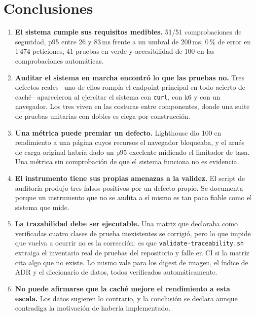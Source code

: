 \documentclass[11pt,a4paper]{article}
\begin{document}
\section{Conclusiones}\label{sec:conclusiones}

\begin{enumerate}[label=\textbf{C\arabic*.},leftmargin=*]
  \item \textbf{El sistema cumple sus requisitos medibles.} 51/51 comprobaciones
        de seguridad, p95 entre 26 y 83\,ms frente a un umbral de 200\,ms, 0\,\% de
        error en 1\,474 peticiones, 41 pruebas en verde y accesibilidad de 100 en
        las comprobaciones automáticas.

  \item \textbf{Auditar el sistema en marcha encontró lo que las pruebas no.} Tres
        defectos reales --uno de ellos rompía el endpoint principal en todo
        acierto de caché-- aparecieron al ejercitar el sistema con \texttt{curl},
        con k6 y con un navegador. Los tres viven en las costuras entre
        componentes, donde una suite de pruebas unitarias con dobles es ciega por
        construcción.

  \item \textbf{Una métrica puede premiar un defecto.} Lighthouse dio 100 en
        rendimiento a una página cuyos recursos el navegador bloqueaba, y el arnés
        de carga original habría dado un p95 excelente midiendo el limitador de
        tasa. Una métrica sin comprobación de que el sistema funciona no es
        evidencia.

  \item \textbf{El instrumento tiene sus propias amenazas a la validez.} El script
        de auditoría produjo tres falsos positivos por un defecto propio. Se
        documenta porque un instrumento que no se audita a sí mismo es tan poco
        fiable como el sistema que mide.

  \item \textbf{La trazabilidad debe ser ejecutable.} Una matriz que declaraba
        como verificadas cuatro clases de prueba inexistentes se corrigió, pero lo
        que impide que vuelva a ocurrir no es la corrección: es que
        \texttt{validate-traceability.sh} extraiga el inventario real de pruebas
        del repositorio y falle en CI si la matriz cita algo que no existe. Lo
        mismo vale para los digest de imagen, el índice de ADR y el diccionario de
        datos, todos verificados automáticamente.

  \item \textbf{No puede afirmarse que la caché mejore el rendimiento a esta
        escala.} Los datos sugieren lo contrario, y la conclusión se declara
        aunque contradiga la motivación de haberla implementado.
\end{enumerate}
\end{document}
